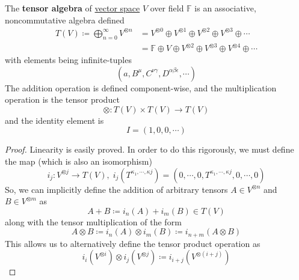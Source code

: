 	\begin{definition}
	  \label{def:tensor-algebra}
    The \textbf{tensor algebra} of \hyperref[def:vector-space]{vector space} $V$ over field $\mathbb{F}$ is an associative, noncommutative algebra defined
    \begin{align}
      T(V) \coloneqq \bigoplus_{n = 0}^{\infty} V^{\otimes n} & = V^{\otimes 0} \oplus V^{\otimes 1} \oplus V^{\otimes 2} \oplus V^{\otimes 3} \oplus \cdots \\
      & = \mathbb{F} \oplus V \oplus V^{\otimes 2} \oplus V^{\otimes 3} \oplus V^{\otimes 4} \oplus\cdots 
    \end{align}
    with elements being infinite-tuples
		\begin{equation}
    	(a, B^\mu, C^{\nu \gamma}, D^{\alpha \beta \epsilon}, \cdots)
		\end{equation}
    The addition operation is defined component-wise, and the multiplication operation is the tensor product 
		\begin{equation}
    	\otimes: T(V) \times T(V) \to T(V)
		\end{equation}
    and the identity element is
		\begin{equation}
    	I = (1, 0, 0, \cdots)
		\end{equation}
  \end{definition}
	\begin{proof}
    Linearity is easily proved. In order to do this rigorously, we must define the map (which is also an isomorphism)
		\begin{equation}
			i_j: V^{\otimes j} \to T(V), \; i_j (T^{\kappa_1, \cdots, \kappa j}) = (0, \cdots,0, T^{\kappa_1, \cdots, \kappa j}, 0, \cdots, 0)
		\end{equation}
		So, we can implicitly define the addition of arbitrary tensors $A \in V^{\otimes n}$ and $B \in V^{\otimes m}$ as 
		\begin{equation}
			A + B \coloneqq i_n (A) + i_m (B) \in T(V)
		\end{equation}
		along with the tensor multiplication of the form
		\begin{equation}
			A \otimes B \coloneqq i_n(A) \otimes i_m(B) \coloneqq i_{n+m} (A \otimes B)
		\end{equation}
		This allows us to alternatively define the tensor product operation as
		\begin{equation}
			i_i(V^{\otimes i}) \otimes i_j( V^{\otimes j}) \coloneqq i_{i+j} (V^{\otimes (i+j)})
		\end{equation}
	\end{proof}

